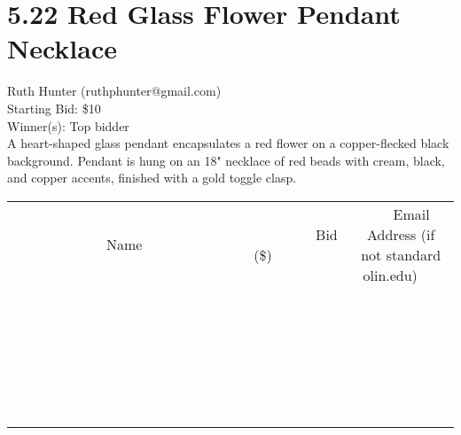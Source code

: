 \documentclass[11pt]{article}
\begin{document}
\section*{5.22 Red Glass Flower Pendant Necklace}
Ruth Hunter (ruthphunter@gmail.com) \\
Starting Bid: \$10 \\
Winner(s): 
Top bidder \\
A heart-shaped glass pendant encapsulates a red flower on a copper-flecked black background.  Pendant is hung on an 18" necklace of red beads with cream, black, and copper accents, finished with a gold toggle clasp. \\[6ex]
\begin{tabular}{c c c}
~~~~~~~~~~~~~Name~~~~~~~~~~~~~ & ~~~~~~~~~Bid (\$)~~~~~~~~~ & ~~~Email Address (if not standard olin.edu)~~~ \\
 & & \\
\hline
 & & \\
\hline
 & & \\
\hline
 & & \\
\hline
 & & \\
\hline
 & & \\
\hline
 & & \\
\hline
 & & \\
\hline
 & & \\
\hline
 & & \\
\hline
 & & \\
\hline
 & & \\
\hline
 & & \\
\hline
 & & \\
\hline
 & & \\
\hline
 & & \\
\hline
 & & \\
\hline
 & & \\
\hline
 & & \\
\hline
 & & \\
\hline
 & & \\
\hline
 & & \\
\hline
 & & \\
\hline
 & & \\
\hline
 & & \\
\hline
 & & \\
\hline
\end{tabular}
\clearpage
\end{document}
